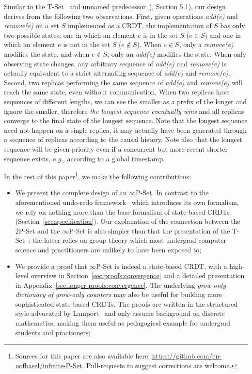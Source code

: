 \documentclass[11pt, oneside]{article}   	%
\begin{document}
Similar to the T-Set~\cite{Dolan2020undoable} and unnamed predecessor~(\cite{Yu2019undo}, Section 5.1), our design derives from the following two observations. First, given operations \textit{add(e)} and \textit{remove(e)} on a set $S$ implemented as a CRDT, the implementation of $S$ has only two possible states: one in which an element $e$ is in the set $S$ ($e \in S$) and one in which an element $e$ is not in the set $S$ ($e \notin S$). When $e \in S$, only a \textit{remove(e)} modifies the state, and when $e \notin S$, only an \textit{add(e)} modifies the state. When only observing state changes, any arbitrary sequence of \textit{add(e)} and \textit{remove(e)} is actually equivalent to a strict alternating sequence of \textit{add(e)} and \textit{remove(e)}. Second, two replicas performing the same sequence of \textit{add(e)} and \textit{remove(e)} will reach the same state, even without communication. When two replicas have sequences of different lengths, we can see the smaller as a prefix of the longer and ignore the smaller, therefore \textit{the longest sequence eventually wins} and all replicas converge to the final state of the longest sequence. Note that the longest sequence need not happen on a single replica, it may actually have been generated through a sequence of replicas according to the causal history. Note also that the longest sequence will be given priority even if a concurrent but more recent shorter sequence exists, \textit{e.g.}, according to a global timestamp.  

In the rest of this paper\footnote{Sources for this paper are also available here: \url{https://github.com/cn-uofbasel/infinite-P-Set}. Pull-requests to suggest corrections are welcome.}, we make the following contributions:
\begin{itemize}
	\item We present the complete design of an $\infty$P-Set. In contrast to the aforementioned undo-redo framework~\cite{Yu2019undo} which introduces its own formalism, we rely on nothing more than the base formalism of state-based CRDTs (Section~\ref{sec:specification}). Our explanation of the connection between the 2P-Set and the $\infty$P-Set is also simpler than that the presentation of the T-Set~\cite{Dolan2020undoable}: the latter relies on group theory which most undergrad computer science and practitioners are unlikely to have been exposed to;
	\item We provide a proof that $\infty$P-Set is indeed a state-based CRDT, with a high-level overview in Section~\ref{sec:proofs:convergence} and a detailed presentation in Appendix~\ref{sec:longer-proofs:convergence}. The underlying \textit{grow-only dictionary of grow-only counters} may also be useful for building more sophisticated state-based CRDTs. The proofs are written in the structured style advocated by Lamport~\cite{lamport2012write} and only assume background on discrete mathematics, making them useful as pedagogical example for undergrad students and practioners;
\end{itemize}
\end{document}
